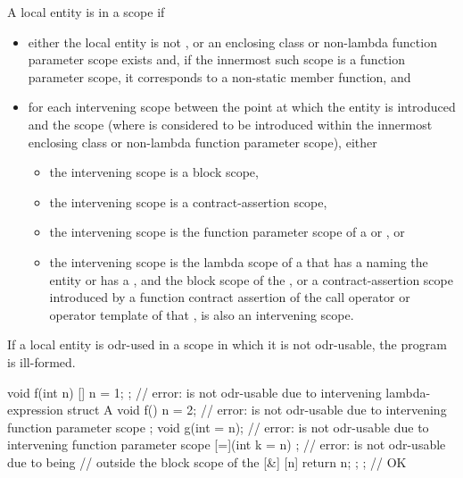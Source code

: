 \pnum
A local entity
is  in a scope if
\begin{itemize}
\item either the local entity is not , or
an enclosing class or non-lambda function parameter scope exists and,
if the innermost such scope is a function parameter scope,
it corresponds to a non-static member function, and
\item
for each intervening scope
between the point at which the entity is introduced and the scope
(where  is considered to be introduced
within the innermost enclosing class or non-lambda function parameter scope),
either
\begin{itemize}
\item the intervening scope is a block scope,
\item the intervening scope is a contract-assertion scope,
\item the intervening scope is the function parameter scope of
a  or , or
\item the intervening scope is the lambda scope of
a 
that has a 
naming the entity or has a , and
the block scope of the ,
or a contract-assertion scope
introduced by a function contract assertion
of the call operator or operator template of that ,
is also an intervening scope.
\end{itemize}
\end{itemize}

If a local entity is odr-used
in a scope in which it is not odr-usable,
the program is ill-formed.
\begin{example}
\begin{codeblock}
void f(int n) {
  [] { n = 1; };                // error:  is not odr-usable due to intervening lambda-expression
  struct A {
    void f() { n = 2; }         // error:  is not odr-usable due to intervening function parameter scope
  };
  void g(int = n);              // error:  is not odr-usable due to intervening function parameter scope
  [=](int k = n) {};            // error:  is not odr-usable due to being
                                // outside the block scope of the 
  [&] { [n]{ return n; }; };    // OK
}
\end{codeblock}
\end{example}

